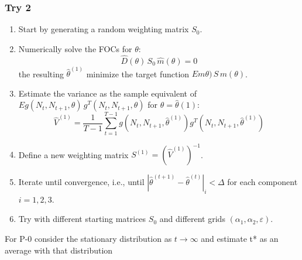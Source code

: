     \subsubsection{Try 2}
    \begin{enumerate}
        \item Start by generating a random weighting matrix $S_0$.
        \item Numerically solve the FOCs for $\theta$:
        \begin{equation}
            \hat D(\theta) \, S_0 \, \hat m (\theta) = 0
        \end{equation}
         the resulting $\hat \theta^{(1)}$ minimize the target function $E m\theta)  \, S \, m(\theta)$.
        \item Estimate the variance as the sample equivalent of $E g(N_t, N_{t+1}, \theta)  \, g^T(N_t, N_{t+1}, \theta)$ for $\theta = \hat \theta(1)$:
        \begin{equation}
            \hat V^{(1)}  = \frac{1}{T-1} \sum_{t=1}^{T-1} g(N_t, N_{t+1}, \hat \theta^{(1)}) g^T(N_t, N_{t+1}, \hat \theta^{(1)})
        \end{equation}
        \item Define a new weighting matrix $S^{(1)} = \left( \hat V^{(1)} \right)^{-1}$.
        \item Iterate until convergence, i.e., until $\left \vert \hat \theta^{(t+1)} - \hat \theta^{(t)} \right \vert_{i} < \Delta$ for each component $i=1,2,3$.
        \item Try with different starting matrices $S_0$ and different grids $(\alpha_1, \alpha_2, \varepsilon)$.
    \end{enumerate}







For P-0 consider the stationary distribution as $t \to \infty $ and estimate t* as an average with that distribution